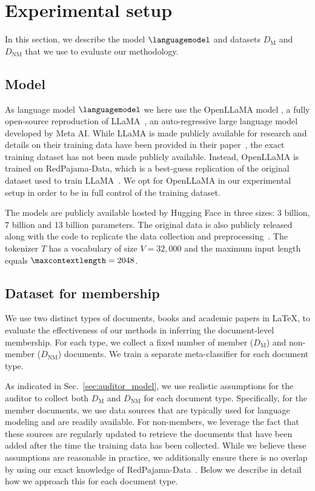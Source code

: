 \documentclass[twocolumn,10pt]{article}
\begin{document}
\section{Experimental setup}
In this section, we describe the model $\languagemodel$ and datasets $D_{\text{M}}$ and $D_{\text{NM}}$ that we use to evaluate our methodology.

\subsection{Model}

As language model $\languagemodel$ we here use the OpenLLaMA model \cite{openlm2023openllama}, a fully open-source reproduction of LLaMA~\cite{touvron2023llama}, an auto-regressive large language model developed by Meta AI. While LLaMA is made publicly available for research and details on their training data have been provided in their paper~\cite{touvron2023llama}, the exact training dataset has not been made publicly available. Instead, OpenLLaMA is trained on RedPajama-Data, which is a best-guess replication of the original dataset used to train LLaMA~\cite{together2023redpajama}. We opt for OpenLLaMA in our experimental setup in order to be in full control of the training dataset.

The models are publicly available hosted by Hugging Face in three sizes: 3 billion, 7 billion and 13 billion parameters. The original data is also publicly released along with the code to replicate the data collection and preprocessing~\cite{together2023redpajama}. The tokenizer $T$ has a vocabulary of size $V = 32,000$ and the maximum input length equals $\maxcontextlength = 2048$. 

\subsection{Dataset for membership}
\label{sec:dataset_membership}

We use two distinct types of documents, books and academic papers in LaTeX, to evaluate the effectiveness of our methods in inferring the document-level membership. For each type, we collect a fixed number of member ($D_{\text{M}}$) and non-member ($D_{\text{NM}}$) documents. We train a separate meta-classifier for each document type. 

As indicated in Sec.~\ref{sec:auditor_model}, we use realistic assumptions for the auditor to collect both $D_{\text{M}}$ and $D_{\text{NM}}$ for each document type. Specifically, for the member documents, we use data sources that are typically used for language modeling and are readily available. For non-members, we leverage the fact that these sources are regularly updated to retrieve the documents that have been added after the time the training data has been collected. While we believe these assumptions are reasonable in practice, we additionally ensure there is no overlap by using our exact knowledge of RedPajama-Data~\cite{together2023redpajama}. Below we describe in detail how we approach this for each document type. 
\end{document}
